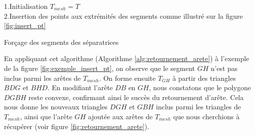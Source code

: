 \vspace{0.5cm}
\begin{algorithm}[h!]
\label{alg:retournement_arete}
\renewcommand{\algorithmcfname}{Algorithme}%
\SetAlgoLined
{}
\vspace{0.2cm}
1.\quad Initialisation $T_{mesh}=T$\\[0.2cm]
2.\quad Insertion des points aux extrémités des segments comme illustré sur la figure \ref{fig:insert_pt}\\[0.2cm]
\caption{Forçage des segments des séparatrices}
\end{algorithm}
\vspace{0.5cm}

En appliquant cet algorithme (Algorithme \ref{alg:retournement_arete}) à l'exemple de la figure \ref{fig:exemple_insert_pt}, on observe que le segment $GH$ n'est pas inclus parmi les arêtes de $T_{mesh}$. On forme ensuite $T_{GH}$ à partir des triangles $BDG$ et $BHD$. En modifiant l'arête $DB$ en $GH$, nous constatons que le polygone $DGBH$ reste convexe, confirmant ainsi le succès du retournement d'arête. Cela nous donne les nouveaux triangles $DGH$ et $GBH$ inclus parmi les triangles de $T_{mesh}$, ainsi que l'arête $GH$ ajoutée aux arêtes de $T_{mesh}$ que nous cherchions à récupérer (voir figure \ref{fig:retournement_arete}).

